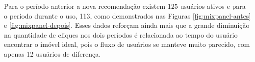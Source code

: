 Para o período anterior a nova recomendação existem 125 usuários ativos e para o período durante o uso, 113, como demonstrados nas Figuras \ref{fig:mixpanel-antes} e \ref{fig:mixpanel-depois}. Esses dados reforçam ainda mais que a grande diminuição na quantidade de cliques nos dois períodos é relacionada ao tempo do usuário encontrar o imóvel ideal, pois o fluxo de usuários se manteve muito parecido, com apenas 12 usuários de diferença.

















